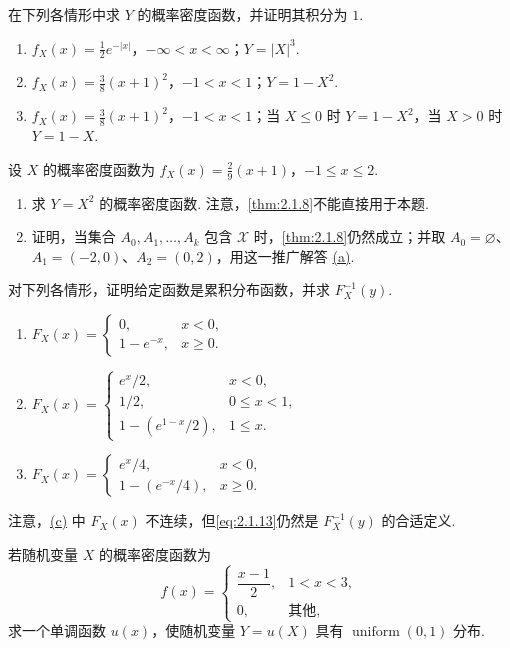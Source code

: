 \begin{exercise}\label{exercise:2.6}
在下列各情形中求 $Y$ 的概率密度函数，并证明其积分为 $1$.
\begin{enumerate}
\item[(a)] $f_X(x)=\frac12e^{-|x|}$，$-\infty<x<\infty$；$Y=|X|^3$.
\item[(b)] $f_X(x)=\frac38(x+1)^2$，$-1<x<1$；$Y=1-X^2$.
\item[(c)] $f_X(x)=\frac38(x+1)^2$，$-1<x<1$；当 $X\le0$ 时 $Y=1-X^2$，当 $X>0$ 时 $Y=1-X$.
\end{enumerate}
\end{exercise}
\begin{exercise}\label{exercise:2.7}
设 $X$ 的概率密度函数为 $f_X(x)=\frac29(x+1)$，$-1\le x\le2$.
\begin{enumerate}
\item[(a)]\label{itm:exercise:2.7:a} 求 $Y=X^2$ 的概率密度函数. 注意，\autoref{thm:2.1.8}不能直接用于本题.
\item[(b)] 证明，当集合 $A_0,A_1,\ldots,A_k$ 包含 $\mathscr X$ 时，\autoref{thm:2.1.8}仍然成立；并取 $A_0=\varnothing$、$A_1=(-2,0)$、$A_2=(0,2)$，用这一推广解答 \hyperref[itm:exercise:2.7:a]{(a)}.
\end{enumerate}
\end{exercise}
\begin{exercise}\label{exercise:2.8}
对下列各情形，证明给定函数是累积分布函数，并求 $F_X^{-1}(y)$.
\begin{enumerate}
\item[(a)] $F_X(x)=\begin{cases}0,&x<0,\\1-e^{-x},&x\ge0.\end{cases}$
\item[(b)] $F_X(x)=\begin{cases}e^x/2,&x<0,\\1/2,&0\le x<1,\\1-(e^{1-x}/2),&1\le x.\end{cases}$
\item[(c)]\label{itm:exercise:2.8:c} $F_X(x)=\begin{cases}e^x/4,&x<0,\\1-(e^{-x}/4),&x\ge0.\end{cases}$
\end{enumerate}
注意，\hyperref[itm:exercise:2.8:c]{(c)} 中 $F_X(x)$ 不连续，但\eqref{eq:2.1.13}仍然是 $F_X^{-1}(y)$ 的合适定义.
\end{exercise}
\begin{exercise}\label{exercise:2.9}
若随机变量 $X$ 的概率密度函数为
$$f(x)=\begin{cases}\dfrac{x-1}2,&1<x<3,\\0,&\text{其他},\end{cases}$$
求一个单调函数 $u(x)$，使随机变量 $Y=u(X)$ 具有 $\operatorname{uniform}(0,1)$ 分布.
\end{exercise}
